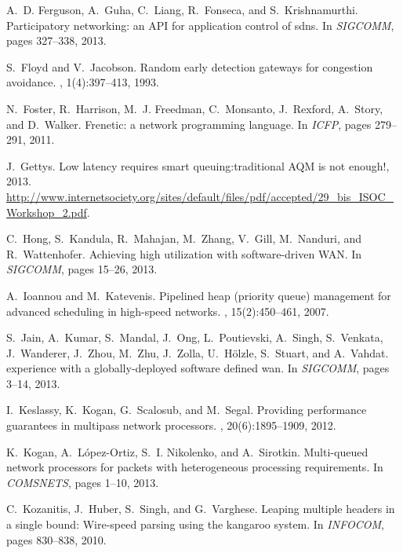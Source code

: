 \documentclass{article}
\begin{document}
\begin{thebibliography}{10}
A.~D. Ferguson, A.~Guha, C.~Liang, R.~Fonseca, and S.~Krishnamurthi.
\newblock Participatory networking: an {API} for application control of sdns.
\newblock In {\em {SIGCOMM}}, pages 327--338, 2013.

S.~Floyd and V.~Jacobson.
\newblock Random early detection gateways for congestion avoidance.
, 1(4):397--413, 1993.

N.~Foster, R.~Harrison, M.~J. Freedman, C.~Monsanto, J.~Rexford, A.~Story, and
  D.~Walker.
\newblock Frenetic: a network programming language.
\newblock In {\em {ICFP}}, pages 279--291, 2011.

J.~Gettys.
\newblock Low latency requires smart queuing:traditional {AQM} is not enough!,
  2013.
\newblock
  \url{http://www.internetsociety.org/sites/default/files/pdf/accepted/29_bis_ISOC_Workshop_2.pdf}.

C.~Hong, S.~Kandula, R.~Mahajan, M.~Zhang, V.~Gill, M.~Nanduri, and
  R.~Wattenhofer.
\newblock Achieving high utilization with software-driven {WAN}.
\newblock In {\em {SIGCOMM}}, pages 15--26, 2013.

A.~Ioannou and M.~Katevenis.
\newblock Pipelined heap (priority queue) management for advanced scheduling in
  high-speed networks.
, 15(2):450--461, 2007.

S.~Jain, A.~Kumar, S.~Mandal, J.~Ong, L.~Poutievski, A.~Singh, S.~Venkata,
  J.~Wanderer, J.~Zhou, M.~Zhu, J.~Zolla, U.~H{\"{o}}lzle, S.~Stuart, and
  A.~Vahdat.
 experience with a globally-deployed software defined wan.
\newblock In {\em {SIGCOMM}}, pages 3--14, 2013.

I.~Keslassy, K.~Kogan, G.~Scalosub, and M.~Segal.
\newblock Providing performance guarantees in multipass network processors.
, 20(6):1895--1909, 2012.

K.~Kogan, A.~L{\'o}pez-Ortiz, S.~I. Nikolenko, and A.~Sirotkin.
\newblock Multi-queued network processors for packets with heterogeneous
  processing requirements.
\newblock In {\em COMSNETS}, pages 1--10, 2013.

C.~Kozanitis, J.~Huber, S.~Singh, and G.~Varghese.
\newblock Leaping multiple headers in a single bound: Wire-speed parsing using
  the kangaroo system.
\newblock In {\em {INFOCOM}}, pages 830--838, 2010.


\end{thebibliography}
\end{document}
